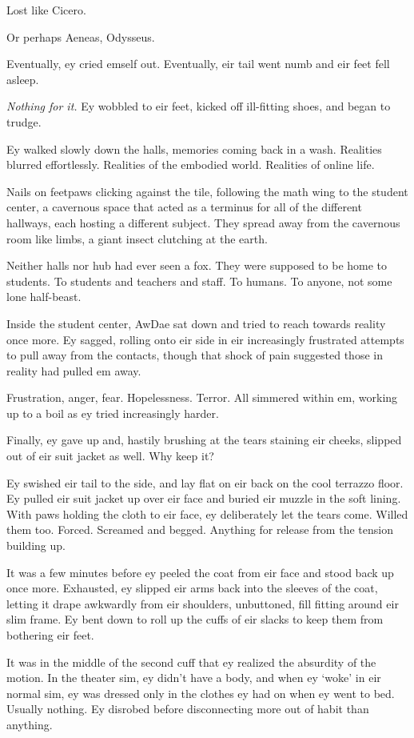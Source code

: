 Lost like Cicero.

Or perhaps Aeneas, Odysseus.

Eventually, ey cried emself out. Eventually, eir tail went numb and eir feet fell asleep.

\emph{Nothing for it.} Ey wobbled to eir feet, kicked off ill-fitting shoes, and began to trudge.

Ey walked slowly down the halls, memories coming back in a wash. Realities blurred effortlessly. Realities of the embodied world. Realities of online life.

Nails on feetpaws clicking against the tile, following the math wing to the student center, a cavernous space that acted as a terminus for all of the different hallways, each hosting a different subject. They spread away from the cavernous room like limbs, a giant insect clutching at the earth.

Neither halls nor hub had ever seen a fox. They were supposed to be home to students. To students and teachers and staff. To humans. To anyone, not some lone half-beast.

Inside the student center, AwDae sat down and tried to reach towards reality once more. Ey sagged, rolling onto eir side in eir increasingly frustrated attempts to pull away from the contacts, though that shock of pain suggested those in reality had pulled em away.

Frustration, anger, fear. Hopelessness. Terror. All simmered within em, working up to a boil as ey tried increasingly harder.

Finally, ey gave up and, hastily brushing at the tears staining eir cheeks, slipped out of eir suit jacket as well. Why keep it?

Ey swished eir tail to the side, and lay flat on eir back on the cool terrazzo floor. Ey pulled eir suit jacket up over eir face and buried eir muzzle in the soft lining. With paws holding the cloth to eir face, ey deliberately let the tears come. Willed them too. Forced. Screamed and begged. Anything for release from the tension building up.

It was a few minutes before ey peeled the coat from eir face and stood back up once more. Exhausted, ey slipped eir arms back into the sleeves of the coat, letting it drape awkwardly from eir shoulders, unbuttoned, fill fitting around eir slim frame. Ey bent down to roll up the cuffs of eir slacks to keep them from bothering eir feet.

It was in the middle of the second cuff that ey realized the absurdity of the motion. In the theater sim, ey didn't have a body, and when ey `woke' in eir normal sim, ey was dressed only in the clothes ey had on when ey went to bed. Usually nothing. Ey disrobed before disconnecting more out of habit than anything.

